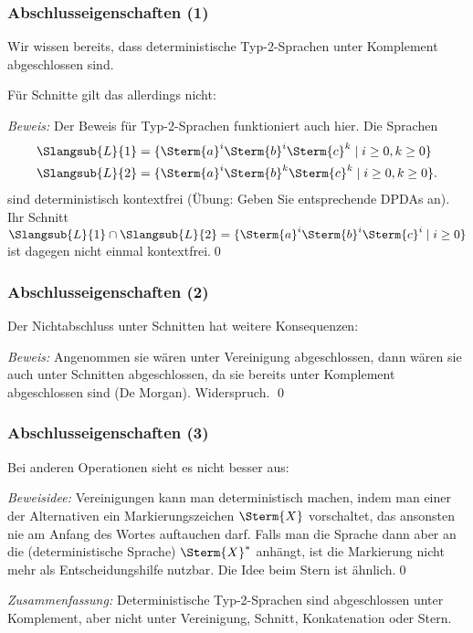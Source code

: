 \documentclass[aspectratio=1610,onlymath]{beamer}
\begin{document}
\begin{frame}\frametitle{Abschlusseigenschaften (1)}

Wir wissen bereits, dass deterministische Typ-2-Sprachen unter Komplement abgeschlossen sind.
\medskip\pause

Für Schnitte gilt das allerdings nicht:
\medskip

\pause

\emph{Beweis:} Der Beweis für Typ-2-Sprachen funktioniert auch hier.
Die Sprachen
\begin{align*}
\Slangsub{L}{1}&= \{\Sterm{a}^i\Sterm{b}^i\Sterm{c}^k\mid i\geq 0, k\geq 0\}\\
\Slangsub{L}{2}&= \{\Sterm{a}^i\Sterm{b}^k\Sterm{c}^k\mid i\geq 0, k\geq 0\}.
\end{align*}
sind deterministisch kontextfrei (Übung: Geben Sie entsprechende DPDAs an). Ihr Schnitt $\Slangsub{L}{1}\cap\Slangsub{L}{2}=\{\Sterm{a}^i\Sterm{b}^i\Sterm{c}^i\mid i\geq 0\}$ ist dagegen nicht einmal kontextfrei.\qed

\end{frame}

\begin{frame}\frametitle{Abschlusseigenschaften (2)}

Der Nichtabschluss unter Schnitten hat weitere Konsequenzen:\medskip

\pause

\emph{Beweis:} Angenommen sie wären unter Vereinigung abgeschlossen, dann
wären sie auch unter Schnitten abgeschlossen, da sie bereits unter Komplement abgeschlossen sind (De Morgan).
Widerspruch.
\qed

\end{frame}

\begin{frame}\frametitle{Abschlusseigenschaften (3)}

Bei anderen Operationen sieht es nicht besser aus:\medskip

\pause

\emph{Beweisidee:} Vereinigungen kann man deterministisch machen, indem man einer der Alternativen ein Markierungszeichen $\Sterm{X}$ vorschaltet, das ansonsten nie am Anfang des Wortes auftauchen darf. Falls man die Sprache dann aber an die (deterministische Sprache) $\Sterm{X}^*$ anhängt, ist die Markierung nicht mehr als Entscheidungshilfe nutzbar.
Die Idee beim Stern ist ähnlich.\qed
\bigskip

\emph{Zusammenfassung:} Deterministische Typ-2-Sprachen sind 
abgeschlossen unter Komplement, aber nicht unter Vereinigung, Schnitt, Konkatenation oder Stern.

\end{frame}
\end{document}
